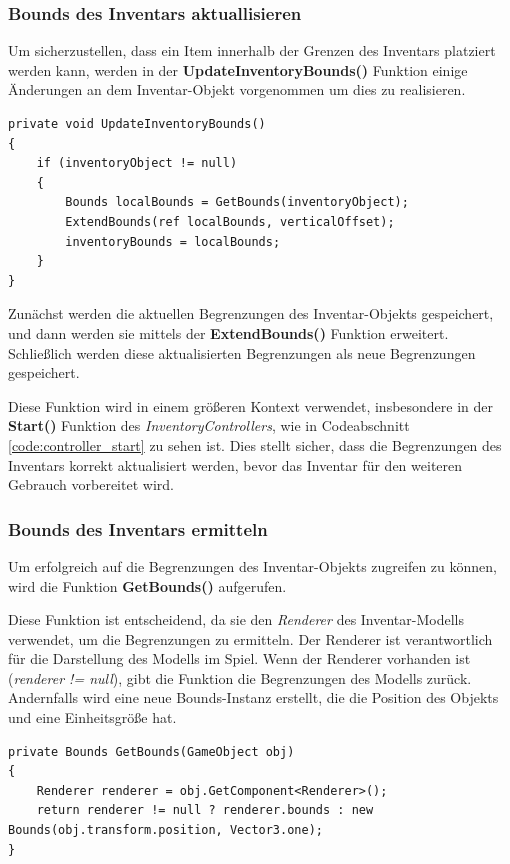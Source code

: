 \subsubsection{Bounds des Inventars aktuallisieren}
Um sicherzustellen, dass ein Item innerhalb der Grenzen des Inventars platziert werden kann, werden in der \textbf{UpdateInventoryBounds()}
Funktion einige Änderungen an dem Inventar-Objekt vorgenommen um dies zu realisieren.
\begin{lstlisting}[style=csharp, caption={Funktion um Inventar Bounds zu erweitern}, label=code:controller_updateBounds]
private void UpdateInventoryBounds()
{
    if (inventoryObject != null)
    {
        Bounds localBounds = GetBounds(inventoryObject);
        ExtendBounds(ref localBounds, verticalOffset);
        inventoryBounds = localBounds;
    }
}
\end{lstlisting}
Zunächst werden die aktuellen Begrenzungen des Inventar-Objekts gespeichert, und dann werden sie mittels der \textbf{ExtendBounds()}
Funktion erweitert. Schließlich werden diese aktualisierten Begrenzungen als neue Begrenzungen gespeichert.

Diese Funktion wird in einem größeren Kontext verwendet, insbesondere in der \textbf{Start()} Funktion des \textit{InventoryControllers},
wie in Codeabschnitt \ref{code:controller_start} zu sehen ist. Dies stellt sicher, dass die Begrenzungen des Inventars
korrekt aktualisiert werden, bevor das Inventar für den weiteren Gebrauch vorbereitet wird.


\subsubsection{Bounds des Inventars ermitteln}
Um erfolgreich auf die Begrenzungen des Inventar-Objekts zugreifen zu können, wird die Funktion \textbf{GetBounds()}
aufgerufen.

Diese Funktion ist entscheidend, da sie den \textit{Renderer} des Inventar-Modells verwendet, um die Begrenzungen zu
ermitteln. Der Renderer ist verantwortlich für die Darstellung des Modells im Spiel. Wenn der Renderer vorhanden ist
(\textit{renderer != null}), gibt die Funktion die Begrenzungen des Modells zurück. Andernfalls wird eine neue Bounds-Instanz
erstellt, die die Position des Objekts und eine Einheitsgröße hat.

\begin{lstlisting}[style=csharp, caption={Funktion um Bounds zu ermitteln}, label=code:controller_getBounds]
private Bounds GetBounds(GameObject obj)
{
    Renderer renderer = obj.GetComponent<Renderer>();
    return renderer != null ? renderer.bounds : new Bounds(obj.transform.position, Vector3.one);
}
\end{lstlisting}

